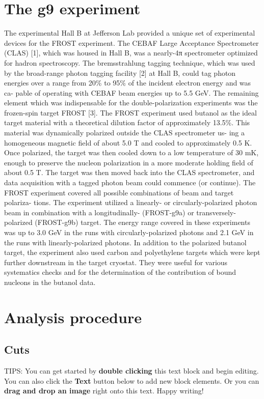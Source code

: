 
\tableofcontents

\section{The g9 experiment}
The experimental Hall B at Jefferson Lab provided a unique set of experimental devices for the
FROST experiment. The CEBAF Large Acceptance Spectrometer (CLAS) [1], which was housed
in Hall B, was a nearly-4π spectrometer optimized for hadron spectroscopy. The bremsstrahlung
tagging technique, which was used by the broad-range photon tagging facility [2] at Hall B, could
tag photon energies over a range from 20\% to 95\% of the incident electron energy and was ca-
pable of operating with CEBAF beam energies up to 5.5 GeV. The remaining element which was
indispensable for the double-polarization experiments was the frozen-spin target FROST [3]. The
FROST experiment used butanol as the ideal target material with a theoretical dilution factor of
approximately 13.5\%. This material was dynamically polarized outside the CLAS spectrometer us-
ing a homogeneous magnetic field of about 5.0 T and cooled to approximately 0.5 K. Once polarized,
the target was then cooled down to a low temperature of 30 mK, enough to preserve the nucleon
polarization in a more moderate holding field of about 0.5 T. The target was then moved back
into the CLAS spectrometer, and data acquisition with a tagged photon beam could commence (or
continue). The FROST experiment covered all possible combinations of beam and target polariza-
tions. The experiment utilized a linearly- or circularly-polarized photon beam in combination with
a longitudinally- (FROST-g9a) or transversely-polarized (FROST-g9b) target. The energy range
covered in these experiments was up to 3.0 GeV in the runs with circularly-polarized photons and
2.1 GeV in the runs with linearly-polarized photons. In addition to the polarized butanol target,
the experiment also used carbon and polyethylene targets which were kept further downstream in
the target cryostat. They were useful for various systematics checks and for the determination of
the contribution of bound nucleons in the butanol data.

\section{Analysis procedure}
\subsection{Cuts}



TIPS:
You can get started by \textbf{double clicking} this text block and begin editing. You can also click the \textbf{Text} button below to add new block elements. Or you can \textbf{drag and drop an image} right onto this text. Happy writing!
